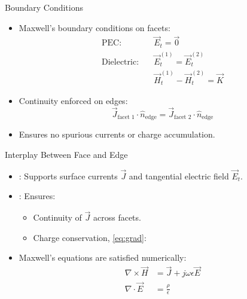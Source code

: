 \begin{frame}{Boundary Conditions}
    \begin{itemize}
        \item Maxwell's boundary conditions on facets:
            \begin{align*}
                \text{PEC:} & \quad \vec{E}_t = \vec{0} \\
                \text{Dielectric:} & \quad \vec{E}_t^{(1)} = \vec{E}_t^{(2)} \\
                & \quad \vec{H}_t^{(1)} - \vec{H}_t^{(2)} = \vec{K}
            \end{align*}
        \item Continuity enforced on edges:
            \[
            \vec{J}_\text{facet 1} \cdot \hat{n}_\text{edge} = \vec{J}_\text{facet 2} \cdot \hat{n}_\text{edge}
            \]
        \item Ensures no spurious currents or charge accumulation.
    \end{itemize}
\end{frame}

\begin{frame}{Interplay Between Face and Edge}
    \begin{itemize}
        \item {}: Supports surface currents \(\vec{J}\) and tangential electric field $\vec{E}_t$.
        \item {}: Ensures:
            \begin{itemize}
                \item Continuity of \(\vec{J}\) across facets.
                \item Charge conservation, \eqref{eq:grad}:
            \end{itemize}
        \item Maxwell’s equations are satisfied numerically:
            \begin{align*}
                \nabla \times \vec{H} &= \vec{J} + j\omega \epsilon \vec{E} \\
                \nabla \cdot \vec{E} &= \frac{\rho}{\epsilon}
            \end{align*}
    \end{itemize}
\end{frame}

